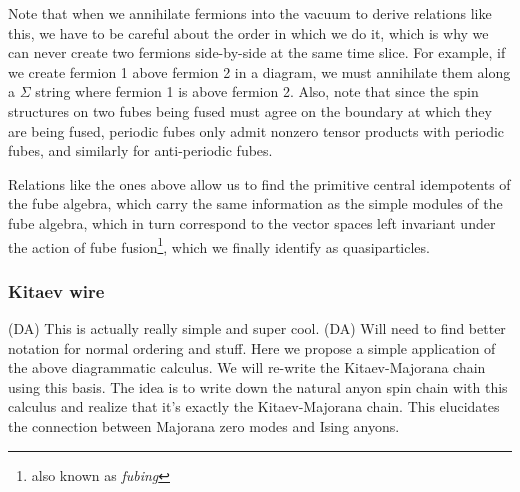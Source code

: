 \documentclass[12pt,a4paper]{article}
\newcommand{\dave}[1]{{\color{ao(english)}\footnotesize{(DA) #1}}}
\newcommand{\remove}[1]{{\color{amber(sae/ece)}\footnotesize{(RM?) #1}}}
\newcommand{\ethan}[1]{{\color{amethyst}\footnotesize{(EL) #1}}}
\begin{document}
Note that when we annihilate fermions into the vacuum to derive relations like this, we have to be careful about the order in which we do it, which is why we can never create two fermions side-by-side at the same time slice. For example, if we create fermion 1 above fermion 2 in a diagram, we must annihilate them along a $\Sigma$ string where fermion 1 is above fermion 2.
Also, note that since the spin structures on two fubes being fused must agree on the boundary at which they are being fused, periodic fubes only admit nonzero tensor products with periodic fubes, and similarly for anti-periodic fubes.

Relations like the ones above allow us to find the primitive central idempotents of the fube algebra, which carry the same information as the simple modules of the fube algebra, which in turn correspond to the vector spaces left invariant under the action of fube fusion\footnote{also known as {\it fubing}}, which we finally identify as quasiparticles. 



\subsubsection{Kitaev wire}
\dave{This is actually really simple and super cool.}
\dave{Will need to find better notation for normal ordering and stuff.}
Here we propose a simple application of the above diagrammatic calculus. 
We will re-write the Kitaev-Majorana chain using this basis. 
The idea is to write down the natural anyon spin chain with this calculus and realize that it's exactly the Kitaev-Majorana chain. 
This elucidates the connection between Majorana zero modes and Ising anyons. 
\end{document}
